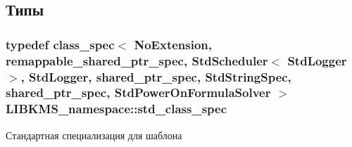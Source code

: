 \subsection{Типы}
\hypertarget{namespaceLIBKMS__namespace_ae7952b6893ea0986997f67d2945fc1a1}{
\subsubsection[{std\-\_\-class\-\_\-spec}]{\setlength{\rightskip}{0pt plus 5cm}typedef {\bf class\-\_\-spec}$<$ No\-Extension, remappable\-\_\-shared\-\_\-ptr\-\_\-spec, Std\-Scheduler$<$ Std\-Logger $>$, Std\-Logger, shared\-\_\-ptr\-\_\-spec, Std\-String\-Spec, shared\-\_\-ptr\-\_\-spec, Std\-Power\-On\-Formula\-Solver $>$ {\bf L\-I\-B\-K\-M\-S\-\_\-namespace\-::std\-\_\-class\-\_\-spec}}}\label{namespaceLIBKMS__namespace_ae7952b6893ea0986997f67d2945fc1a1}


Стандартная специализация для шаблона 


